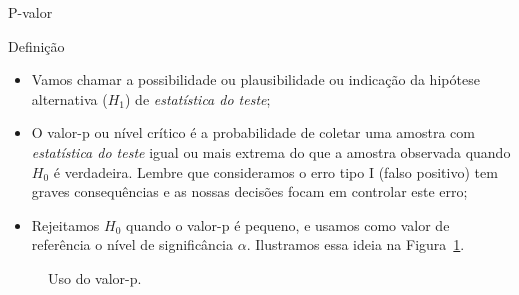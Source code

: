 \documentclass[8pt]{beamer}
\begin{document}
\begin{frame}{P-valor}

\normalsize

	\begin{block}{Definição}
		\begin{itemize}
			\item Vamos chamar a possibilidade ou plausibilidade ou indicação da hipótese alternativa ($H_1$) de \textit{estatística do teste};
			\item O valor-p ou nível crítico é a probabilidade de coletar uma amostra com \textit{estatística do teste} igual ou mais extrema do que a amostra observada quando $H_0$ é verdadeira. Lembre que consideramos o erro tipo I (falso positivo) tem graves consequências e as nossas decisões focam em controlar este erro;
			\item Rejeitamos $H_0$ quando o valor-p é pequeno, e usamos como valor de referência o nível de significância $\alpha$. Ilustramos essa ideia na Figura~\ref{fig:p-valor}.
		\end{itemize}			
	\begin{figure}[htbp]
		\centering
		\caption{Uso do valor-p.}
		\label{fig:p-valor}
	\end{figure}
	\end{block}

\normalsize

\end{frame}
\end{document}
